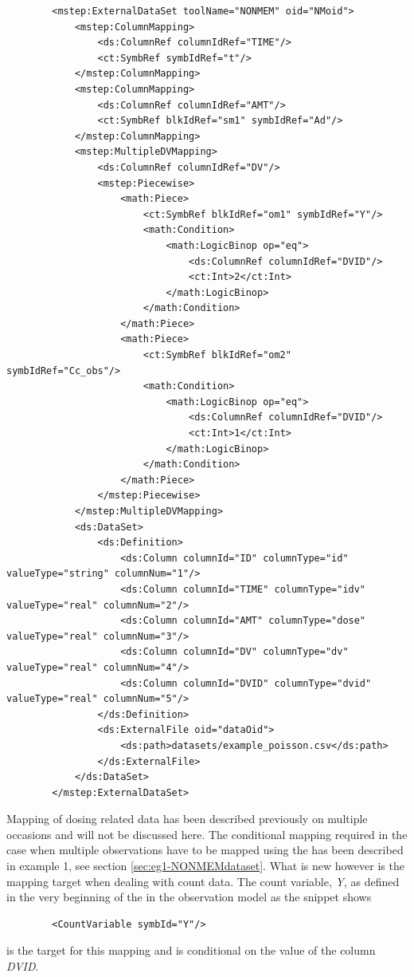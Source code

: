 \lstset{language=XML}
\begin{lstlisting}
        <mstep:ExternalDataSet toolName="NONMEM" oid="NMoid">
            <mstep:ColumnMapping>
                <ds:ColumnRef columnIdRef="TIME"/>
                <ct:SymbRef symbIdRef="t"/>
            </mstep:ColumnMapping>
            <mstep:ColumnMapping>
                <ds:ColumnRef columnIdRef="AMT"/>
                <ct:SymbRef blkIdRef="sm1" symbIdRef="Ad"/>
            </mstep:ColumnMapping>
            <mstep:MultipleDVMapping>
                <ds:ColumnRef columnIdRef="DV"/>
                <mstep:Piecewise>
                    <math:Piece>
                        <ct:SymbRef blkIdRef="om1" symbIdRef="Y"/>
                        <math:Condition>
                            <math:LogicBinop op="eq">
                                <ds:ColumnRef columnIdRef="DVID"/>
                                <ct:Int>2</ct:Int>
                            </math:LogicBinop>
                        </math:Condition>
                    </math:Piece>
                    <math:Piece>
                        <ct:SymbRef blkIdRef="om2" symbIdRef="Cc_obs"/>
                        <math:Condition>
                            <math:LogicBinop op="eq">
                                <ds:ColumnRef columnIdRef="DVID"/>
                                <ct:Int>1</ct:Int>
                            </math:LogicBinop>
                        </math:Condition>
                    </math:Piece>
                </mstep:Piecewise>
            </mstep:MultipleDVMapping>
            <ds:DataSet>
                <ds:Definition>
                    <ds:Column columnId="ID" columnType="id" valueType="string" columnNum="1"/>
                    <ds:Column columnId="TIME" columnType="idv" valueType="real" columnNum="2"/>
                    <ds:Column columnId="AMT" columnType="dose" valueType="real" columnNum="3"/>
                    <ds:Column columnId="DV" columnType="dv" valueType="real" columnNum="4"/>
                    <ds:Column columnId="DVID" columnType="dvid" valueType="real" columnNum="5"/>
                </ds:Definition>
                <ds:ExternalFile oid="dataOid">
                    <ds:path>datasets/example_poisson.csv</ds:path>
                </ds:ExternalFile>
            </ds:DataSet>
        </mstep:ExternalDataSet>
\end{lstlisting}

Mapping of dosing related data has been described previously on
multiple occasions and will not be discussed here. The conditional mapping required 
in the case when multiple observations have to be mapped using the 
has been described in example 1, see section \ref{sec:eg1-NONMEMdataset}. 
What is new however is the mapping target when dealing with count data.
The count variable, \emph{Y}, as defined in the very beginning of the  
in the observation model  as the snippet shows
\lstset{language=XML}
\begin{lstlisting}
		<CountVariable symbId="Y"/>
\end{lstlisting}
is the target for this mapping and is conditional on the value of the column \emph{DVID}.




